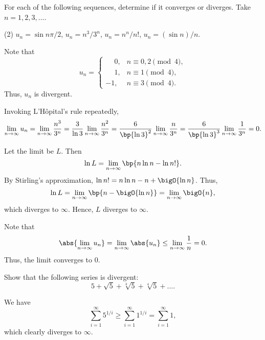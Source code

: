 \begin{problem}
    For each of the following sequences, determine if it converges or diverges. Take $n = 1, 2, 3, \dots$.

    \begin{tasks}(2)
        \task $u_n = \sin{n\pi/2}$,
        \task $u_n = n^3/3^n$,
        \task $u_n = n^n / n!$,
        \task $u_n = (\sin n)/n$.
    \end{tasks}
\end{problem}
\begin{solution}
    \begin{ppart}
        Note that \[u_n = \begin{cases}
            \phantom{-}0, & n \equiv 0, 2 \pmod{4},\\
            \phantom{-}1, & n \equiv 1 \pmod{4},\\
            -1, & n \equiv 3 \pmod{4}.
        \end{cases}\] Thus, $u_n$ is divergent.
    \end{ppart}
    \begin{ppart}
        Invoking L'H\^{o}pital's rule repeatedly, \[\lim_{n \to \infty} u_n = \lim_{n \to \infty} \frac{n^3}{3^n} = \frac{3}{\ln 3} \lim_{n \to \infty} \frac{n^2}{3^n} = \frac{6}{\bp{\ln 3}^2} \lim_{n \to \infty} \frac{n}{3^n} = \frac{6}{\bp{\ln 3}^3} \lim_{n \to \infty} \frac1{3^n} = 0.\]
    \end{ppart}
    \begin{ppart}
        Let the limit be $L$. Then \[\ln L = \lim_{n \to \infty} \bp{n \ln n - \ln n!}.\] By Stirling's approximation, $\ln n! = n\ln n - n + \bigO{\ln n}$. Thus, \[\ln L = \lim_{n \to \infty} \bp{n - \bigO{\ln n}} = \lim_{n \to \infty} \bigO{n},\] which diverges to $\infty$. Hence, $L$ diverges to $\infty$.
    \end{ppart}
    \begin{ppart}
        Note that \[\abs{\lim_{n \to \infty} u_n} = \lim_{n \to \infty} \abs{u_n} \leq \lim_{n \to \infty} \frac{1}{n} = 0.\] Thus, the limit converges to 0.
    \end{ppart}
\end{solution}

\begin{problem}
    Show that the following series is divergent: \[5 + \sqrt5 + \sqrt[3]{5} + \sqrt[4]{5} + \dots.\]
\end{problem}
\begin{solution}
    We have \[\sum_{i = 1}^\infty 5^{1/i} \geq \sum_{i = 1}^\infty 1^{1/i} = \sum_{i = 1}^\infty 1,\] which clearly diverges to $\infty$.
\end{solution}

